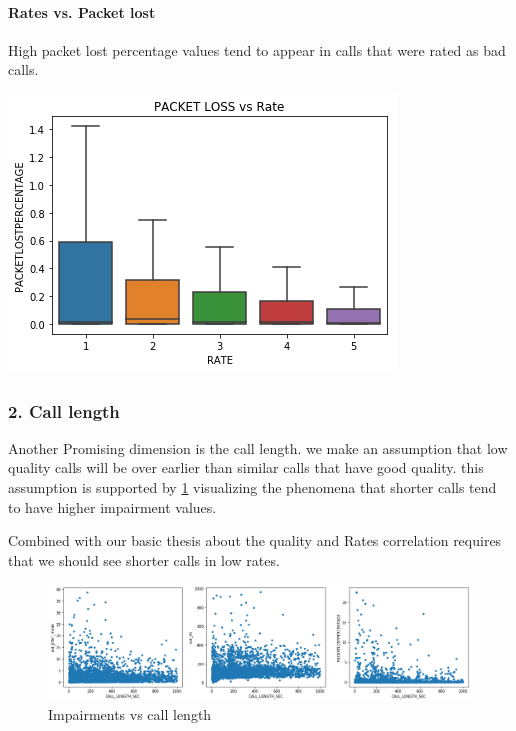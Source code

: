     
\paragraph{Rates vs. Packet lost}\label{rates-vs.-packet-lost}

High packet lost percentage values tend to appear in calls that were
rated as bad calls.




\begin{center}
\includegraphics{figures/output_29_0.png}
\end{center}
    
\subsubsection{2. Call length}\label{call-length}

Another Promising dimension is the call length. we make an assumption that low quality calls will be over earlier than similar calls that have good quality. this assumption is supported by \ref{fig:Impairments_Length} visualizing the phenomena that shorter calls tend to have higher impairment values.

Combined with our basic thesis about the quality and Rates correlation requires that  we should see shorter calls in low rates.

\begin{figure}
    \centering
    \includegraphics[scale=0.4]{figures/impairments_length.png}
    \caption{Impairments vs call length}
    \label{fig:Impairments_Length}
\end{figure}




